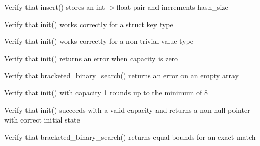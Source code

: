 \begin{DoxyRefList}
%
Verify that insert() stores an int-\/\texorpdfstring{$>$}{>}float pair and increments hash\+\_\+size  
\item[Global \doxylink{test__dict_8cpp_a978922259efb3bf5500bed6d66ab180f}{TEST\+\_\+F} (\doxylink{classDictTest}{Dict\+Test}, Init\+Struct\+Key\+Succeeds)]\label{test__test000218}%
%
Verify that init() works correctly for a struct key type  
\item[Global \doxylink{test__dict_8cpp_ac7bcab5d2f33e5f23542502f22107edc}{TEST\+\_\+F} (\doxylink{classDictTest}{Dict\+Test}, Init\+Non\+Trivial\+Value\+Succeeds)]\label{test__test000217}%
%
Verify that init() works correctly for a non-\/trivial value type  
\item[Global \doxylink{test__dict_8cpp_aae7952639fbf3ae6171a009453d8b4f7}{TEST\+\_\+F} (\doxylink{classDictTest}{Dict\+Test}, Init\+Zero\+Capacity\+Returns\+Error)]\label{test__test000216}%
%
Verify that init() returns an error when capacity is zero  
\item[Global \doxylink{test__array_8cpp_a12ea8938d78d5a0b06613fdb991c1f7b}{TEST\+\_\+F} (\doxylink{classArrayInitTest}{Array\+Init\+Test}, Bracketed\+Binary\+Search\+Int\+Empty\+Array\+Returns\+Error)]\label{test__test000206}%
%
Verify that bracketed\+\_\+binary\+\_\+search() returns an error on an empty array  
\item[Global \doxylink{test__dict_8cpp_ad47922fb8394f03a859157993703ce0c}{TEST\+\_\+F} (\doxylink{classDictTest}{Dict\+Test}, Init\+Capacity\+Rounds\+Up\+To\+Minimum)]\label{test__test000214}%
%
Verify that init() with capacity 1 rounds up to the minimum of 8  
\item[Global \doxylink{test__dict_8cpp_ac32bb8289619f4b68da954260e5d0359}{TEST\+\_\+F} (\doxylink{classDictTest}{Dict\+Test}, Init\+Int\+Float\+Succeeds)]\label{test__test000213}%
%
Verify that init() succeeds with a valid capacity and returns a non-\/null pointer with correct initial state  
\item[Global \doxylink{test__array_8cpp_a5560e6f40b4972b2248f396d3cbc6fe3}{TEST\+\_\+F} (\doxylink{classArrayInitTest}{Array\+Init\+Test}, Bracketed\+Binary\+Search\+Point\+Exact\+Match)]\label{test__test000212}%
%
Verify that bracketed\+\_\+binary\+\_\+search() returns equal bounds for an exact  match  
\item[Global \doxylink{test__array_8cpp_a66e12b3aa82e03bad4513d67dbf37a34}{TEST\+\_\+F} (\doxylink{classArrayInitTest}{Array\+Init\+Test}, Bracketed\+Binary\+Search\+Point\+Value\+Between\+Elements)]\label{test__test000211}%

\end{DoxyRefList}
